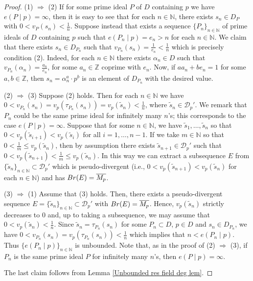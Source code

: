 \documentclass{article}
\theoremstyle{definition}\newtheorem{Def}[equation]{Definition}
\theoremstyle{definition}\newtheorem{Ques}[equation]{Question}
\theoremstyle{definition}\newtheorem{Conj}[equation]{Conjecture}
\theoremstyle{definition}\newtheorem{Not}[equation]{Notation}
\newcommand{\N}{\mathbb{N}}
\newcommand{\Q}{\mathbb{Q}}
\newcommand{\oP}{\overline{P}}
\newcommand{\Z}{\mathbb{Z}}
\newcommand{\oMp}{\overline{M_p}}
\newcommand{\Br}{\textnormal{Br}}
\numberwithin{equation}{section}
\begin{document}
\begin{proof}
(1) $\Rightarrow$ (2) If for some prime ideal $P$ of $D$ containing $p$ we have $e(P\mid p)=\infty$, then it is easy to see that for each $n\in\N$, there exists $s_n\in D_P$ with $0<v_P(s_n)<\frac{1}{n}$. Suppose instead  that exists a sequence $\{P_n\}_{n\in\N}$ of prime ideals of $D$ containing $p$ such that $e(P_n\mid p)=e_n>n$ for each $n\in\N$. We claim that there exists $s_n\in D_{P_n}$ such that $v_{P_n}(s_n)=\frac{1}{e_n}<\frac{1}{n}$  which is precisely condition (2). Indeed, for each $n\in\N$ there exists $\alpha_n\in D$ such that $v_{P_n}(\alpha_n)=\frac{a_n}{e_n}$, for some $a_n\in \Z$ coprime with $e_n$. Now, if $aa_n+be_n=1$ for some $a,b\in\Z$, then $s_n=\alpha_n^a\cdot p^b$ is an element of $D_{P_n}$ with the desired value. 





(2) $\Rightarrow$ (3) Suppose (2) holds. Then for each $n\in\N$ we have $0<v_{P_n}(s_n)=v_p(\tau_{P_n}(s_n))=v_p(\tilde{s}_n)<\frac{1}{n}$, where $\tilde{s}_n\in\mathcal{D}_p'$. We remark that $P_n$ could be the same prime ideal for infinitely many $n$'s; this corresponds to the case $e(P\mid p)=\infty$. Suppose that for some $n\in\N$, we have $\tilde{s}_1,\ldots,\tilde{s}_n$ so that 
$0<v_p(\tilde{s}_{i+1})<v_p(\tilde{s}_i)$ for all $i=1,\ldots,n-1$. If we take $m\in\N$ so that $0<\frac{1}{m}\leq v_p(\tilde{s}_n)$, then by assumption there exists $\tilde{s}_{n+1}\in\mathcal{D}_p'$ such that $0<v_p(\tilde{s}_{n+1})<\frac{1}{m}\leq v_p(\tilde{s}_n)$. In this way we can extract a subsequence $E$ from $\{\tilde{s}_n\}_{n\in\N}\subset\mathcal{D}_p'$ which is pseudo-divergent (i.e., $0<v_p(\tilde{s}_{n+1})<v_p(\tilde{s}_{n})$ for each $n\in\N$) and has $\Br(E)=\overline{M_p}$.

(3) $\Rightarrow$ (1) Assume that (3) holds. Then, there exists a pseudo-divergent sequence $E=\{\tilde{s}_n\}_{n\in\N}\subset\mathcal{D}_p'$   with $\Br(E)=\overline{M_p}$. Hence, $v_p(\tilde{s}_n)$ strictly decreases to $0$ and, up to taking a subsequence, we may assume that $0<v_p(\tilde{s}_n)<\frac{1}{n}$. Since $\tilde{s}_n=\tau_{P_n}(s_n)$ for some $P_n\subset D$, $p\in D$ and $s_n\in D_{P_n}$, we have $0<v_{P_n}(s_n)=v_p(\tau_{P_n}(s_n))<\frac{1}{n}$ which implies that $n<e(P_n\mid p)$. Thus $\{e(P_n\mid p)\}_{n\in\N}$ is unbounded. Note that, as in the proof of (2) $\Rightarrow$ (3), if $P_n$ is the same prime ideal $P$ for infinitely many $n$'s, then  $e(P\mid p)=\infty$.

The last claim follows from Lemma \ref{Unbounded res field deg lem}.
\end{proof}
\end{document}
